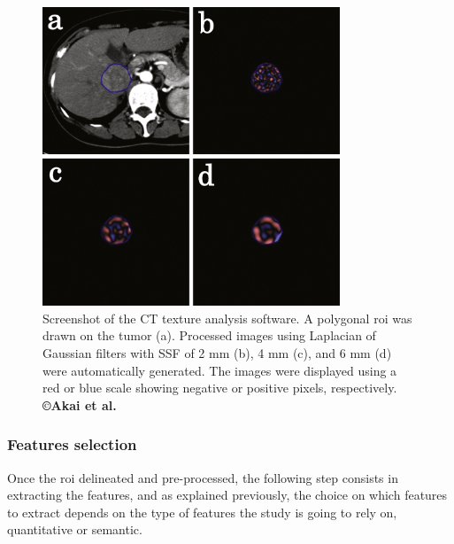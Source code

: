 \begin{figure}[ht!]
\centering
\includegraphics[width=3.50110in,height=3.51334in]{./images/image15.png}
\caption{ Screenshot of the CT texture analysis software. A polygonal \ac{roi} was
drawn on the tumor (a). Processed images using Laplacian of Gaussian
filters with SSF of 2 mm (b), 4 mm (c), and 6 mm (d) were automatically
generated. The images were displayed using a red or blue scale showing
negative or positive pixels, respectively. \textbf{©Akai et al.} \cite{Akai2018}}
\label{AkaiFig_Roi}
\end{figure}

\subsubsection{Features selection}\label{features-selection-1}

Once the \ac{roi} delineated and pre-processed, the following step consists
in extracting the features, and as explained previously, the choice on
which features to extract depends on the type of features the study is
going to rely on, quantitative or semantic.


